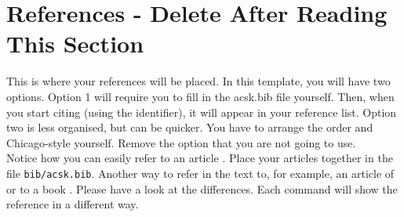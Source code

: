 \newpage %
\section*{References - Delete After Reading This Section}
\noindent This is where your references will be placed. In this template, you will have two options. Option 1 will require you to fill in the acsk.bib file yourself. Then, when you start citing (using the identifier), it will appear in your reference list. Option two is less organised, but can be quicker. You have to arrange the order and Chicago-style yourself. Remove the option that you are not going to use.\\

\noindent Notice how you can easily refer to an article \citep{Zako94A}. Place your articles together in the file {\tt bib/acsk.bib}. Another way to refer in the text to, for example, an
article of \citet{Engl82A} or to a book \citep{Tayl86A}. Please have a look at the differences. Each command will show the reference in a different way. \\







